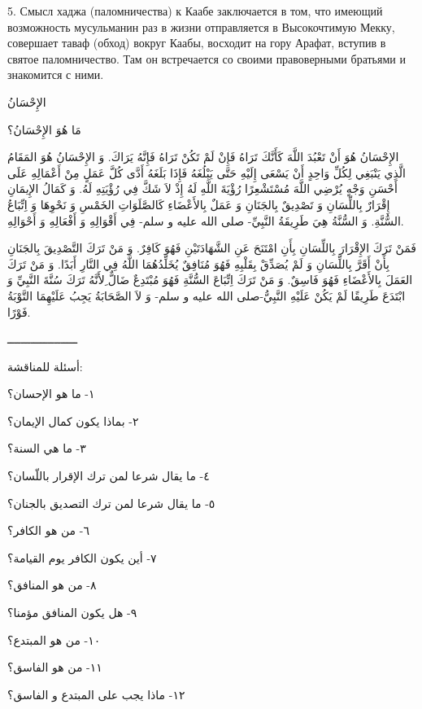 \documentclass[a5paper]{article}
\begin{document}
5. Смысл хаджа (паломничества) к Каабе заключается в том, что имеющий возможность мусульманин раз в жизни отправляется в Высокочтимую Мекку, совершает таваф (обход) вокруг Каабы, восходит на гору Арафат, вступив в святое паломничество. Там он встречается со своими правоверными братьями и знакомится с ними.

الإِحْسَانُ

مَا هُوَ الإِحْسَانُ؟

الإِحْسَانُ هُوَ أَنْ تَعْبُدَ اللَّهَ كَأَنَّكَ تَرَاهُ فَإِنْ لَمْ تَكُنْ تَرَاهُ فَإِنَّهُ يَرَاكَ. وَ الإِحْسَانُ هُوَ المَقَامُ الَّذِي يَنْبَغِي لِكُلِّ وَاحِدٍ أَنْ يَسْعَى إِلَيْهِ حَتَّى يَبْلُغَهُ فَإِذَا بَلَغَهُ أَدَّى كُلَّ عَمَلٍ مِنْ أَعْمَالِهِ عَلَى أَحْسَنِ وَجْهٍ يُرْضِي اللَّهَ مُسْتَشْعِرًا رُؤْيَةَ اللَّهِ لَهُ إِذْ لاَ شَكَّ فِي رُؤْيَتِهِ لَهُ. وَ كَمَالُ الإِيمَانِ إِقْرَارٌ بِاللِّسَانِ وَ تَصْدِيقٌ بِالجَنَانِ وَ عَمَلٌ بِالأَعْضَاءِ كَالصَّلَوَاتِ الخَمْسِ وَ نَحْوِهَا وَ اِتِّبَاعُ السُّنَّةِ. وَ السُّنَّةُ هِيَ طَرِيقَةُ النَّبِيِّ- صلى الله عليه و سلم- فِي أَقْوَالِهِ وَ أَفْعَالِهِ وَ أَحْوَالِهِ.

فَمَنْ تَرَكَ الإِقْرَارَ بِاللِّسَانِ بِأَنِ امْتَنَحَ عَنِ الشَّهَادَتَيْنِ فَهُوَ كَافِرٌ. وَ مَنْ تَرَكَ التَّصْدِيقَ بِالجَنَانِ بِأَنْ أَقَرَّ بِاللِّسَانِ وَ لَمْ يُصَدِّقْ بِقَلْبِهِ فَهُوَ مُنَافِقٌ يُخَلِّدُهُمَا اللَّهُ فِي النَّارِ أَبَدًا. وَ مَنْ تَرَكَ العَمَلَ بِالأَعْضَاءِ فَهُوَ فَاسِقٌ. وَ مَنْ تَرَكَ اِتِّبَاعَ السُّنَّةِ فَهُوَ مُبْتَدِعٌ ضَالٌّ ِلأَنَّهُ تَرَكَ سُنَّةَ النَّبِيِّ وَ ابْتَدَعَ طَرِيقًا لَمْ يَكُنْ عَلَيْهِ النَّبِيُّ-صلى الله عليه و سلم- وَ لاَ الصَّحَابَةُ يَجِبُ عَلَيْهِمَا التَّوْبَةُ فَوْرًا.

ـــــــــــــــــــــ

أسئلة للمناقشة:

١- ما هو الإحسان؟

٢- بماذا يكون كمال الإيمان؟

٣- ما هي السنة؟

٤- ما يقال شرعا لمن ترك الإقرار باللّسان؟

٥- ما يقال شرعا لمن ترك التصديق بالجنان؟

٦- من هو الكافر؟

٧- أين يكون الكافر يوم القيامة؟

٨- من هو المنافق؟

٩- هل يكون المنافق مؤمنا؟

١٠- من هو المبتدع؟

١١- من هو الفاسق؟

١٢- ماذا يجب على المبتدع و الفاسق؟
\end{document}
